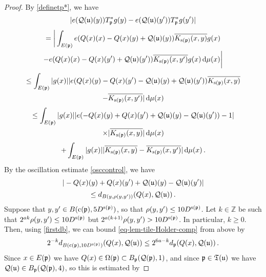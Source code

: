     \begin{proof}
        By \eqref{definetp*}, we have
        $$
            |e({\mathcal{Q}}({\mathfrak u})(y)) T_{{\mathfrak p}}^* g(y) - e({\mathcal{Q}}({\mathfrak u})(y')) T_{{\mathfrak p}}^* g(y')|
        $$
        \begin{multline*}
            =\bigg| \int_{E({\mathfrak p})} e({Q}(x)(x) - {Q}(x)(y) + {\mathcal{Q}}({\mathfrak u})(y)) \overline{K_{{\mathrm{s}}({\mathfrak p})}(x, y)} g(x) \\
            - e({Q}(x)(x) - {Q}(x)(y') + {\mathcal{Q}}({\mathfrak u})(y')) \overline{K_{{\mathrm{s}}({\mathfrak p})}(x, y')} g(x) \, \mathrm{d}\mu(x)\bigg|
        \end{multline*}
        \begin{multline*}
            \leq\int_{E({\mathfrak p})} |g(x)| |e({Q}(x)(y) - {Q}(x)(y') - {\mathcal{Q}}({\mathfrak u})(y) + {\mathcal{Q}}({\mathfrak u})(y'))\overline{K_{{\mathrm{s}}({\mathfrak p})}(x, y)}\\
            - \overline{K_{{\mathrm{s}}({\mathfrak p})}(x, y')}| \, \mathrm{d}\mu(x)
        \end{multline*}
        \begin{multline}
            \leq\int_{E({\mathfrak p})} |g(x)| |e(-{Q}(x)(y) + {Q}(x)(y') + {\mathcal{Q}}({\mathfrak u})(y) - {\mathcal{Q}}({\mathfrak u})(y')) - 1| \\
            \times |\overline{K_{{\mathrm{s}}({\mathfrak p})}(x, y)}|\, \mathrm{d}\mu(x) \label{T*Holder1b}
        \end{multline}
      \begin{equation}
            + \int_{E({\mathfrak p})} |g(x)| |\overline{K_{{\mathrm{s}}({\mathfrak p})}(x, y)} - \overline{K_{{\mathrm{s}}({\mathfrak p})}(x, y')} |\, \mathrm{d}\mu(x)\,.\label{T*Holder1}
        \end{equation}
        By the oscillation estimate \eqref{osccontrol}, we have
        $$
            |-{Q}(x)(y) + {Q}(x)(y') + {\mathcal{Q}}({\mathfrak u})(y) - {\mathcal{Q}}({\mathfrak u})(y')|
        $$
      \begin{equation}
            \label{eq-lem-tile-Holder-comp}
            \le d_{B(y, \rho(y,y'))}({Q}(x), {\mathcal{Q}}({\mathfrak u}))\,.
        \end{equation}
        Suppose that $y, y' \in B({\mathrm{c}}({\mathfrak p}), 5D^{{\mathrm{s}}({\mathfrak p})})$, so that $\rho(y,y') \le 10D^{{\mathrm{s}}({\mathfrak p})}$. Let $k \in \mathbb{Z}$ be such that $2^{ak}\rho(y,y') \le 10D^{{\mathrm{s}}({\mathfrak p})}$ but $2^{a(k+1)} \rho(y,y') > 10D^{{\mathrm{s}}({\mathfrak p})}$. In particular, $k \ge 0$. Then, using \eqref{firstdb}, we can bound \eqref{eq-lem-tile-Holder-comp} from above by
        $$
            2^{-k} d_{B({\mathrm{c}}({\mathfrak p}), 10 D^{{\mathrm{s}}({\mathfrak p})})}({Q}(x), {\mathcal{Q}}({\mathfrak u})) \le 2^{6a - k} d_{{\mathfrak p}}({Q}(x), {\mathcal{Q}}({\mathfrak u}))\,.
        $$
        Since $x \in E({\mathfrak p})$ we have ${Q}(x) \in \Omega({\mathfrak p}) \subset B_{{\mathfrak p}}({\mathcal{Q}}({\mathfrak p}), 1)$, and since ${\mathfrak p} \in {\mathfrak T}({\mathfrak u})$ we have ${\mathcal{Q}}({\mathfrak u}) \in B_{{\mathfrak p}}({\mathcal{Q}}({\mathfrak p}), 4)$, so this is estimated by

\end{proof}

